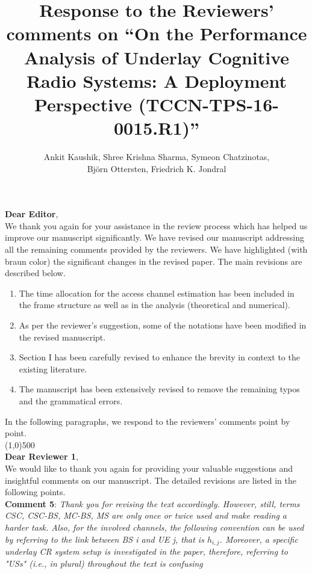 \documentclass[12pt,a4wide,peerreview]{IEEEtran}
\newcommand{\tcg}[1]{\textcolor[RGB]{139,69,19}{#1}}
\begin{document}
\title{ \hsize=6.5in
Response to the Reviewers' comments on
``On the Performance Analysis of Underlay Cognitive Radio Systems: A Deployment Perspective (TCCN-TPS-16-0015.R1)''}
\author{\baselineskip10pt
Ankit Kaushik, Shree Krishna Sharma, Symeon Chatzinotas, \\ Bj\"orn Ottersten, Friedrich K. Jondral
}
\maketitle
\baselineskip24pt
\textbf{Dear Editor},\\
 We thank you again for your assistance in the review process which has helped us improve our manuscript significantly. We have revised our manuscript addressing all the remaining comments provided by the reviewers. We have highlighted \tcg{(with braun color)} the significant changes in the revised paper. The main revisions are described below.
\begin{enumerate}
\item The time allocation for the access channel estimation has been included in the frame structure as well as in the analysis (theoretical and numerical).
\item As per the reviewer's suggestion, some of the notations have been modified in the revised manuscript. 
\item Section I has been carefully revised to enhance the brevity in context to the existing literature. 
\item The manuscript has been extensively revised to remove the remaining typos and the grammatical errors. 
\end{enumerate}
In the following paragraphs, we respond to the reviewers' comments point by point. \\
\line(1,0){500} \\
\textbf{Dear Reviewer 1},\\
\baselineskip24pt
We would like to thank you again for providing your valuable suggestions and insightful comments on our manuscript. The detailed revisions are listed in the following points. 
\\
\textbf{Comment 5}: 
\textit{Thank you for revising the text accordingly. However, still, terms CSC, CSC-BS, MC-BS, MS are only once or twice used and make reading a harder task. Also, for the involved channels, the following convention can be used by referring to the link between BS i and UE j, that is $h_{i,j}$. Moreover, a specific underlay CR system setup is investigated in the paper, therefore, referring to "USs" (i.e., in plural) throughout the text is confusing
}
\end{document}
